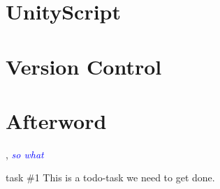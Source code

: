 \documentclass[BSP,english,oneside]{classes/gucthesis}
\newcommand{\comment}[1]{\textcolor{blue}{\emph{#1}}}
\newcommand{\todo}[1]{{\color{green}#1}}
\begin{document}
\chapter{UnityScript}
	\label{chap:UnityScript}
	


\chapter{Version Control}
	\label{chap:VersionControl}
	


\chapter{Afterword}
	\label{chap:afterword}
	






\appendix %
\appendixpage
\addappheadtotoc







\GUC, 
\comment{so what}

\todo{task \#1}
This is a todo-task we need to get done.
\end{document}
